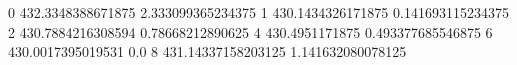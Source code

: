 0 432.3348388671875 2.333099365234375
1 430.1434326171875 0.141693115234375
2 430.7884216308594 0.78668212890625
4 430.4951171875 0.493377685546875
6 430.0017395019531 0.0
8 431.14337158203125 1.141632080078125
